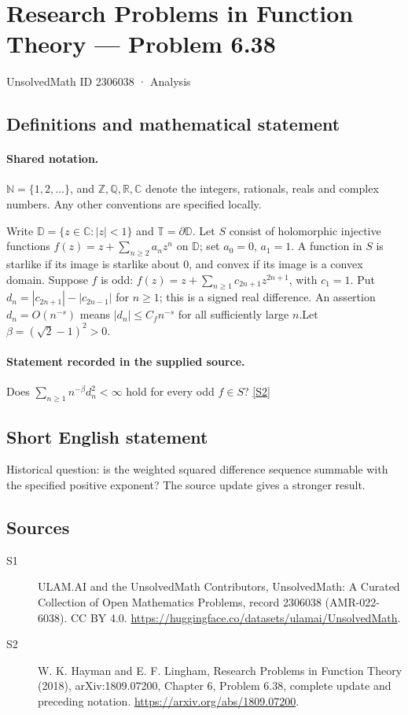 \documentclass[11pt]{article}
\newcommand{\sref}[2]{\hyperlink{source:#1:#2}{[S#2]}}
\begin{document}
\setcounter{section}{2306037}
\section{Research Problems in Function Theory — Problem 6.38}\label{2306038}
{\small\sffamily UnsolvedMath ID 2306038 · Analysis}
\subsection{Definitions and mathematical statement}

\paragraph{Shared notation.}$\mathbb N=\{1,2,\ldots\}$, and $\mathbb Z,\mathbb Q,\mathbb R,\mathbb C$ denote the integers, rationals, reals and complex numbers. Any other conventions are specified locally.


Write $\mathbb D=\{z\in\mathbb C:|z|<1\}$ and $\mathbb T=\partial\mathbb D$. Let $S$ consist of holomorphic injective functions $f(z)=z+\sum_{n\ge2}a_nz^n$ on $\mathbb D$; set $a_0=0$, $a_1=1$. A function in $S$ is starlike if its image is starlike about $0$, and convex if its image is a convex domain. Suppose $f$ is odd: $f(z)=z+\sum_{n\ge1}c_{2n+1}z^{2n+1}$, with $c_1=1$. Put $d_n=|c_{2n+1}|-|c_{2n-1}|$ for $n\ge1$; this is a signed real difference. An assertion $d_n=O(n^{-s})$ means $|d_n|\le C_f n^{-s}$ for all sufficiently large $n$.Let $\beta=(\sqrt2-1)^2>0$.
\paragraph{Statement recorded in the supplied source.}
Does $\sum_{n\ge1}n^{-\beta}d_n^2<\infty$ hold for every odd $f\in S$? \sref{2306038}{2}
\subsection{Short English statement}
Historical question: is the weighted squared difference sequence summable with the specified positive exponent? The source update gives a stronger result.
\subsection{Sources}
\begin{description}
\item[\hypertarget{source:2306038:1}{S1}] ULAM.AI and the UnsolvedMath Contributors, UnsolvedMath: A Curated Collection of Open Mathematics Problems, record 2306038 (AMR-022-6038). CC BY 4.0. \url{https://huggingface.co/datasets/ulamai/UnsolvedMath}.
\item[\hypertarget{source:2306038:2}{S2}] W. K. Hayman and E. F. Lingham, Research Problems in Function Theory (2018), arXiv:1809.07200, Chapter 6, Problem 6.38, complete update and preceding notation. \url{https://arxiv.org/abs/1809.07200}.
\end{description}
\label{end:2306038}
\end{document}
